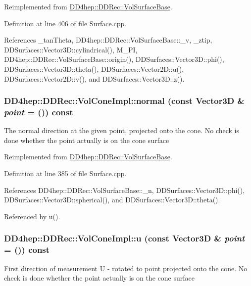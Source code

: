 Reimplemented from \hyperlink{class_d_d4hep_1_1_d_d_rec_1_1_vol_surface_base_a62f5625f6f620535765193e97990fb1d}{DD4hep::DDRec::VolSurfaceBase}.

Definition at line 406 of file Surface.cpp.

References \_\-tanTheta, DD4hep::DDRec::VolSurfaceBase::\_\-v, \_\-ztip, DDSurfaces::Vector3D::cylindrical(), M\_\-PI, DD4hep::DDRec::VolSurfaceBase::origin(), DDSurfaces::Vector3D::phi(), DDSurfaces::Vector3D::theta(), DDSurfaces::Vector2D::u(), DDSurfaces::Vector2D::v(), and DDSurfaces::Vector3D::z().\hypertarget{class_d_d4hep_1_1_d_d_rec_1_1_vol_cone_impl_aea04fc521c39ffc8e97ae3f700533e7a}{
\subsubsection[{normal}]{ DD4hep::DDRec::VolConeImpl::normal (const {\bf Vector3D} \& {\em point} = {()}) const}}
\label{class_d_d4hep_1_1_d_d_rec_1_1_vol_cone_impl_aea04fc521c39ffc8e97ae3f700533e7a}
The normal direction at the given point, projected onto the cone. No check is done whether the point actually is on the cone surface 

Reimplemented from \hyperlink{class_d_d4hep_1_1_d_d_rec_1_1_vol_surface_base_a0689bccd5a024798609f3ce1b39c7d61}{DD4hep::DDRec::VolSurfaceBase}.

Definition at line 385 of file Surface.cpp.

References DD4hep::DDRec::VolSurfaceBase::\_\-n, DDSurfaces::Vector3D::phi(), DDSurfaces::Vector3D::spherical(), and DDSurfaces::Vector3D::theta().

Referenced by u().\hypertarget{class_d_d4hep_1_1_d_d_rec_1_1_vol_cone_impl_ae3f99967ddeb67c1ad76414cea068395}{
\subsubsection[{u}]{ DD4hep::DDRec::VolConeImpl::u (const {\bf Vector3D} \& {\em point} = {()}) const}}
\label{class_d_d4hep_1_1_d_d_rec_1_1_vol_cone_impl_ae3f99967ddeb67c1ad76414cea068395}
First direction of measurement U -\/ rotated to point projected onto the cone. No check is done whether the point actually is on the cone surface 

